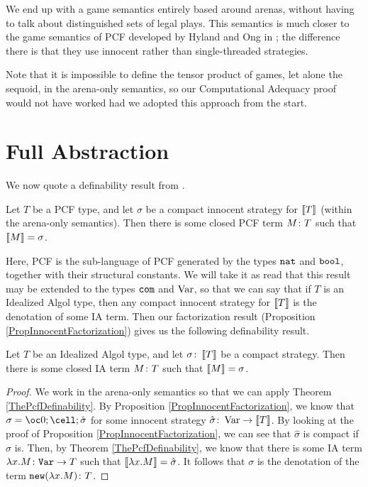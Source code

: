 We end up with a game semantics entirely based around arenas, without having to talk about distinguished sets of legal plays.
This semantics is much closer to the game semantics of PCF developed by Hyland and Ong in \cite{hoPcf}; the difference there is that they use innocent rather than single-threaded strategies.

Note that it is impossible to define the tensor product of games, let alone the sequoid, in the arena-only semantics, so our Computational Adequacy proof would not have worked had we adopted this approach from the start.

\section{Full Abstraction}

We now quote a definability result from \cite{hoPcf}.

\begin{theorem}
  Let $T$ be a PCF type, and let $\sigma$ be a compact innocent strategy for $\left\llbracket T\right\rrbracket$ (within the arena-only semantics).  
  Then there is some closed PCF term $M\colon T$ such that $\left\llbracket M\right\rrbracket=\sigma$.
  \label{ThePcfDefinability}
\end{theorem}

Here, PCF is the sub-language of PCF generated by the types ${\mathtt{nat}}$ and ${\mathtt{bool}}$, together with their structural constants.  
We will take it as read that this result may be extended to the types ${\mathtt{com}}$ and $\operatorname{Var}$, so that we can say that if $T$ is an Idealized Algol type, then any compact innocent strategy for $\left\llbracket T\right\rrbracket$ is the denotation of some IA term.
Then our factorization result (Proposition \ref{PropInnocentFactorization}) gives us the following definability result.

\begin{proposition}
  Let $T$ be an Idealized Algol type, and let $\sigma\colon \left\llbracket T\right\rrbracket$ be a compact strategy.
  Then there is some closed IA term $M\colon T$ such that $\left\llbracket M\right\rrbracket=\sigma$.
  \label{PropIaDefinability}
\end{proposition}
\begin{proof}
  We work in the arena-only semantics so that we can apply Theorem \ref{ThePcfDefinability}.  
  By Proposition \ref{PropInnocentFactorization}, we know that $\sigma=\oc 0;\cell;\hat{\sigma}$ for some innocent strategy $\hat\sigma \colon \operatorname{Var} \to \left\llbracket T\right\rrbracket$.
  By looking at the proof of Proposition \ref{PropInnocentFactorization}, we can see that $\hat\sigma$ is compact if $\sigma$ is.
  Then, by Theorem \ref{ThePcfDefinability}, we know that there is some IA term $\lambda x.M\colon {\mathtt{Var}} \to T$ such that $\left\llbracket\lambda x.M\right\rrbracket=\hat\sigma$.  
  It follows that $\sigma$ is the denotation of the term ${\mathtt{new}}(\lambda x.M)\colon T$.
\end{proof}

